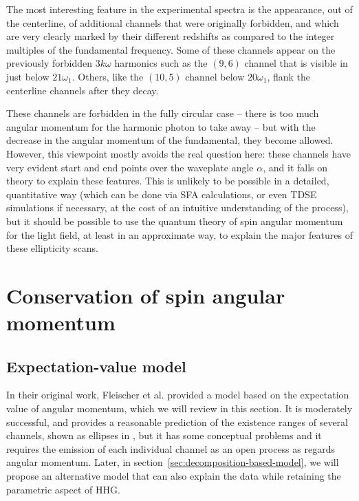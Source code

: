 The most interesting feature in the experimental spectra is the appearance, out of the centerline, of additional channels that were originally forbidden, and which are very clearly marked by their different redshifts as compared to the integer multiples of the fundamental frequency. Some of these channels appear on the previously forbidden $3k\omega$ harmonics such as the $(9,6)$ channel that is visible in  just below $21\omega_1$. Others, like the $(10,5)$ channel below $20\omega_1$, flank the centerline channels after they decay. 


These channels are forbidden in the fully circular case -- there is too much angular momentum for the harmonic photon to take away -- but with the decrease in the angular momentum of the fundamental, they become allowed. However, this viewpoint mostly avoids the real question here: these channels have very evident start and end points over the waveplate angle $\alpha$, and it falls on theory to explain these features. This is unlikely to be possible in a detailed, quantitative way (which can be done via SFA calculations, or even TDSE simulations if necessary, at the cost of an intuitive understanding of the process), but it should be possible to use the quantum theory of spin angular momentum for the light field, at least in an approximate way, to explain the major features of these ellipticity scans.






\section{Conservation of spin angular momentum}

\subsection{Expectation-value model}
\label{sec:expectation-value-model}
In their original work, Fleischer et al. provided a model based on the expectation value of angular momentum, which we will review in this section. It is moderately successful, and provides a reasonable prediction of the existence ranges of several channels, shown as ellipses in , but it has some conceptual problems and it requires the emission of each individual channel as an open process as regards angular momentum. Later, in section~\ref{sec:decomposition-based-model}, we will propose an alternative model that can also explain the data while retaining the parametric aspect of HHG.


